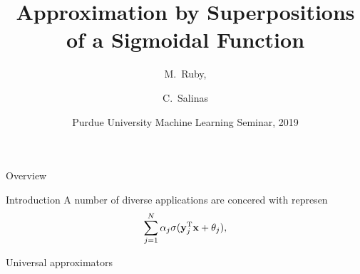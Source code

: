 \documentclass[11pt,letterpape]{beamer}
\title[Approximation by a Sigmoidal Function] 
{Approximation by Superpositions of a Sigmoidal Function}
\author[M.\ Ruby, C.\ Salinas] 
{M.\ Ruby,%
  \and C.\ Salinas%
}
\institute[Purdue University] %
{
  Department of Mathematics\\
  Purdue University
 }
\date[Spring 2019] %
{Purdue University Machine Learning Seminar, 2019}
\begin{document}
\frame{\titlepage}
\begin{frame}{Overview}
  \tableofcontents
\end{frame}
\begin{frame}{Introduction}
  A number of diverse applications are concered with represen
  \[
    \sum_{j=1}^N\alpha_j\sigma(\mathbf{y}_j^{\mathrm{T}}\mathbf{x}+\theta_j),
  \]
\end{frame}
\begin{frame}{Universal approximators}
\end{frame}
\end{document}
